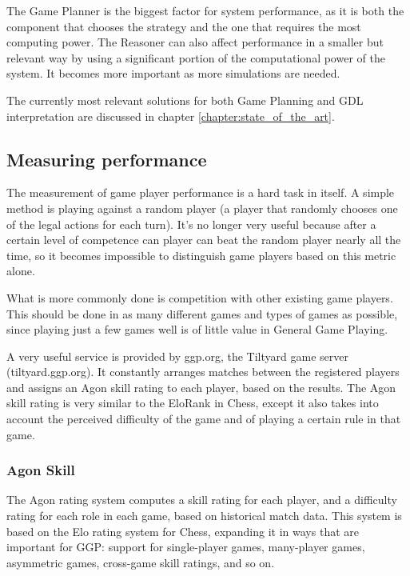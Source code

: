 The Game Planner is the biggest factor for system performance, as it is both the component that chooses the strategy and the one that requires the most computing power. The Reasoner can also affect performance in a smaller but relevant way by using a significant portion of the computational power of the system. It becomes more important as more simulations are needed.

The currently most relevant solutions for both Game Planning and GDL interpretation are discussed in chapter \ref{chapter:state_of_the_art}.

\subsection{Measuring performance}
\label{sssec:MeasuringPerformance}

The measurement of game player performance is a hard task in itself. A simple method is playing against a random player (a player that randomly chooses one of the legal actions for each turn). It's no longer very useful because after a certain level of competence can player can beat the random player nearly all the time, so it becomes impossible to distinguish game players based on this metric alone.

What is more commonly done is competition with other existing game players. This should be done in as many different games and types of games as possible, since playing just a few games well is of little value in General Game Playing.

A very useful service is provided by ggp.org, the Tiltyard game server (tiltyard.ggp.org). It constantly arranges matches between the registered players and assigns an Agon skill rating to each player, based on the results. The Agon skill rating is very similar to the EloRank in Chess, except it also takes into account the perceived difficulty of the game and of playing a certain rule in that game.

\subsubsection{Agon Skill}
\label{sssec:AgonSkill}

The Agon rating system computes a skill rating for each player, and a difficulty rating for each role in each game, based on historical match data. This system is based on the Elo rating system for Chess, expanding it in ways that are important for GGP: support for single-player games, many-player games, asymmetric games, cross-game skill ratings, and so on.

